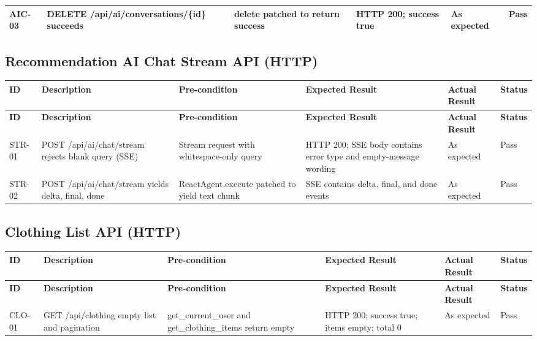 \begin{appendices}
{\begin{longtable}{|p{1.2cm}|p{3.0cm}|p{3.0cm}|p{3.2cm}|p{2.2cm}|p{1.1cm}|}
AIC-03 &
DELETE /api/ai/conversations/\{id\} succeeds &
delete patched to return success &
HTTP 200; success true &
As expected &
Pass \\
\hline

\end{longtable}

\subsection*{Recommendation AI Chat Stream API (HTTP)}
\begin{longtable}{|p{1.2cm}|p{3.0cm}|p{3.0cm}|p{3.2cm}|p{2.2cm}|p{1.1cm}|}
\hline
\textbf{ID} & \textbf{Description} & \textbf{Pre-condition} & \textbf{Expected Result} & \textbf{Actual Result} & \textbf{Status} \\
\hline
\endfirsthead
\hline
\textbf{ID} & \textbf{Description} & \textbf{Pre-condition} & \textbf{Expected Result} & \textbf{Actual Result} & \textbf{Status} \\
\hline
\endhead
\hline
\endfoot

STR-01 &
POST /api/ai/chat/stream rejects blank query (SSE) &
Stream request with whitespace-only query &
HTTP 200; SSE body contains error type and empty-message wording &
As expected &
Pass \\
\hline

STR-02 &
POST /api/ai/chat/stream yields delta, final, done &
ReactAgent.execute patched to yield text chunk &
SSE contains delta, final, and done events &
As expected &
Pass \\
\hline

\end{longtable}

\subsection*{Clothing List API (HTTP)}
\begin{longtable}{|p{1.2cm}|p{3.0cm}|p{3.0cm}|p{3.2cm}|p{2.2cm}|p{1.1cm}|}
\hline
\textbf{ID} & \textbf{Description} & \textbf{Pre-condition} & \textbf{Expected Result} & \textbf{Actual Result} & \textbf{Status} \\
\hline
\endfirsthead
\hline
\textbf{ID} & \textbf{Description} & \textbf{Pre-condition} & \textbf{Expected Result} & \textbf{Actual Result} & \textbf{Status} \\
\hline
\endhead
\hline
\endfoot

CLO-01 &
GET /api/clothing empty list and pagination &
get\_current\_user and get\_clothing\_items return empty &
HTTP 200; success true; items empty; total 0 &
As expected &
Pass \\
\hline


\end{longtable}}
\end{appendices}

